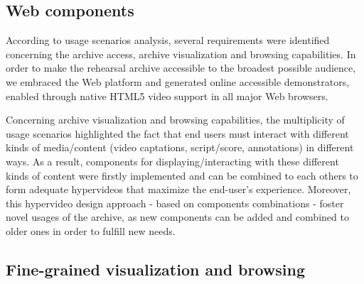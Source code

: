 \documentclass[conference]{IEEEtran}
\newcommand{\todo}[1]{\noindent\textcolor{red}{{\bf \{ToDo} #1{\bf \}}}}
\begin{document}
%
%



\subsection{Web components}
According to usage scenarios analysis, several requirements were identified concerning the archive access, archive visualization and browsing capabilities. In order to make the rehearsal archive accessible to the broadest possible audience, we embraced the Web platform and generated online accessible demonstrators, enabled through native HTML5 video support in all major Web browsers.

Concerning archive visualization and browsing capabilities, the multiplicity of usage scenarios highlighted the fact that end users must interact with different kinds of media/content (video captations, script/score, annotations) in different ways. As a result, components for displaying/interacting with these different kinds of content were firstly implemented and can be combined to each others to form adequate hypervideos that maximize the end-user's experience. Moreover, this hypervideo design approach - based on components combinations - foster novel usages of the archive, as new components can be added and combined to older ones in order to fulfill new needs.

\subsection{Fine-grained visualization and browsing}
\end{document}
